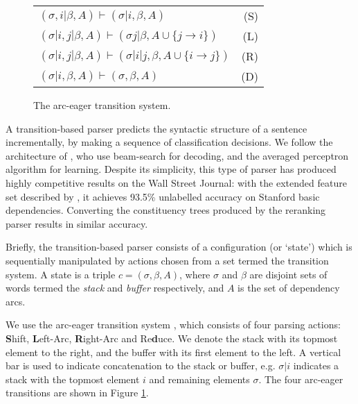 \documentclass[11pt,letterpaper]{article}
\begin{document}
\begin{figure}
    \centering
    \begin{tabular}{lr}
        $(\sigma,i | \beta, A) \vdash (\sigma | i, \beta, A) $ \hfill & \hfill (S) \\
        $(\sigma | i,j | \beta, A) \vdash ( \sigma j |  \beta, A \cup \{ j \rightarrow i \} ) $ \hfill & \hfill (L) \\
        $(\sigma | i,j | \beta, A) \vdash ( \sigma | i | j, \beta, A \cup \{ i \rightarrow j \} ) $ \hfill & \hfill (R) \\
        $(\sigma | i, \beta, A) \vdash ( \sigma, \beta, A )$ \hfill & \hfill  (D) \\


    \end{tabular}
    \caption{\small The arc-eager transition system.\label{fig:ae_notation}}
\end{figure}


A transition-based parser predicts the syntactic structure of a sentence incrementally,
by making a sequence of classification decisions.  We follow the architecture of
\citet{zhang:cl11}, who use beam-search for decoding, and the averaged
perceptron algorithm for learning.  Despite its simplicity, this type of parser
has produced highly competitive results on the Wall Street Journal: with the
extended feature set described by \citet{zhang:11}, it achieves 93.5\%
unlabelled accuracy on Stanford basic dependencies.  Converting
the constituency trees produced by the \citet{Charniak05a} reranking parser
results in similar accuracy.

Briefly, the transition-based parser consists of a configuration (or `state') which
is sequentially
manipulated by actions chosen from a set
termed the transition system.  A state is a triple $c = (\sigma, \beta, A)$, where
$\sigma$ and $\beta$ are disjoint sets of words termed the \emph{stack} and
\emph{buffer} respectively, and $A$ is the set of dependency arcs.

We use the arc-eager transition system \citep{nivre:03,nivre:cl}, which consists
of four parsing actions:  \textbf{S}hift, \textbf{L}eft-Arc,
\textbf{R}ight-Arc and Re\textbf{d}uce.
We denote the stack with its topmost element
to the right, and the buffer with its first element to the left. A vertical bar
is used to indicate concatenation to the stack or buffer, e.g. $\sigma | i$ indicates
a stack with the topmost element $i$ and remaining elements $\sigma$.  The
four arc-eager transitions are shown in Figure \ref{fig:ae_notation}.
\end{document}
